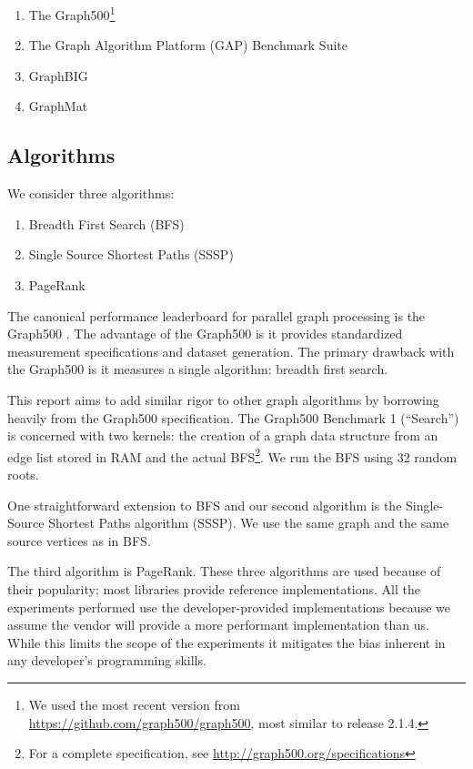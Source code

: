 \documentclass[conference]{IEEEtran}
\begin{document}
\begin{enumerate}
	\item The Graph500\footnote{We used the most recent version from \url{https://github.com/graph500/graph500}, most similar to release 2.1.4.} \cite{Murphy:2010:Graph500}
	\item The Graph Algorithm Platform (GAP) Benchmark Suite \cite{Beamer:2015:GAPBench}
	\item GraphBIG \cite{Nai:2015:Graphbig}
	\item GraphMat \cite{Sundaram:2015:GraphMat}
\end{enumerate}

\subsection{Algorithms}

We consider three algorithms:

\begin{enumerate}
	\item Breadth First Search (BFS)
	\item Single Source Shortest Paths (SSSP)
	\item PageRank
\end{enumerate}

The canonical performance leaderboard for parallel graph processing is the Graph500 \cite{Murphy:2010:Graph500}. The advantage of the Graph500 is it provides standardized measurement specifications and dataset generation. The primary drawback with the Graph500 is it measures a single algorithm: breadth first search.

This report aims to add similar rigor to other graph algorithms by borrowing heavily from the Graph500 specification. The Graph500 Benchmark 1 (``Search'') is concerned with two kernels: the creation of a graph data structure from an edge list stored in RAM and the actual BFS\footnote{For a complete specification, see \url{http://graph500.org/specifications}}. We run the BFS using 32 random roots.

One straightforward extension to BFS and our second algorithm is the Single-Source Shortest Paths algorithm (SSSP). We use the same graph and the same source vertices as in BFS.

The third algorithm is PageRank. These three algorithms are used because of their popularity; most libraries provide reference implementations. All the experiments performed use the developer-provided implementations because we assume the vendor will provide a more performant implementation than us. While this limits the scope of the experiments it mitigates the bias inherent in any developer's programming skills.
\end{document}
